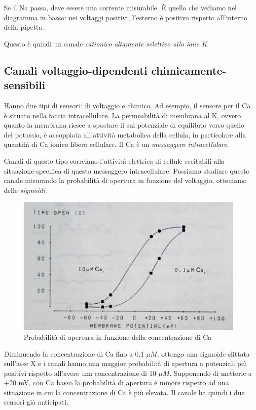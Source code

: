 \documentclass[a4paper,12pt]{article}
\begin{document}
Se il Na passa, deve essere una corrente misurabile. È quello che vediamo nel diagramma in basso: nei voltaggi positivi, l'esterno è positivo rispetto all'interno della pipetta.

Questo è quindi un canale \emph{cationico altamente selettivo allo ione K}.

\subsection{Canali voltaggio-dipendenti chimicamente-sensibili}
Hanno due tipi di sensori: di voltaggio e chimico. Ad esempio, il sensore per il Ca è situato nella faccia intracellulare. La permeabilità di membrana al K, ovvero quanto la membrana riesce a spostare il sui potenziale di equilibrio verso quello del potassio, è accoppiata all'attività metabolica della cellula, in particolare alla quantità di Ca ionico libero cellulare. Il Ca è un \emph{messaggero intracellulare}.

Canali di questo tipo correlano l'attività elettrica di cellule eccitabili alla situazione specifica di questo messaggero intracellulare. Possiamo studiare questo canale misurando la probabilità di apertura in funzione del voltaggio, otteniamo delle \emph{sigmoidi}.
\begin{figure}[H]
\centering
\includegraphics[scale=0.4]{immagine/sigmoidi.jpg}
\caption{Probabilità di apertura in funzione della concentrazione di Ca}
\end{figure} 

Diminuendo la concentrazione di Ca fino a 0,1 $\mu M$, ottengo una sigmoide slittata sull'asse X e i canali hanno una maggior probabilità di apertura a potenziali più positivi rispetto all'avere una concentrazione di 10 $\mu M$. Supponendo di metteric a +20 mV, con Ca basso la probabilità di apertura è minore rispetto ad una situazione in cui la concentrazione di Ca è più elevata. Il canale ha quindi i due sensori già anticipati.
\end{document}
